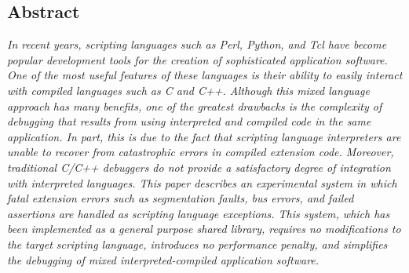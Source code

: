\author{{David M.\ Beazley} \\
{\em Department of Computer Science} \\
{\em University of Chicago }\\
{\em Chicago, Illinois 60637 }\\
{\em beazley@cs.uchicago.edu }}

 

\maketitle

\thispagestyle{empty}


\subsection*{Abstract}
{\em
In recent years, scripting languages such as Perl, Python, and Tcl
have become popular development tools for the creation of
sophisticated application software.  One of the most useful features
of these languages is their ability to easily interact with compiled
languages such as C and C++.  Although this mixed language approach
has many benefits, one of the greatest drawbacks is the complexity of
debugging that results from using interpreted and compiled code in the
same application.  In part, this is due to the fact that scripting
language interpreters are unable to recover from catastrophic errors
in compiled extension code. Moreover, traditional C/C++ debuggers
do not provide a satisfactory degree of integration with interpreted
languages.  This paper describes an experimental system in which fatal
extension errors such as segmentation faults, bus errors, and failed
assertions are handled as scripting language exceptions.  This system,
which has been implemented as a general purpose shared library,
requires no modifications to the target scripting language, introduces
no performance penalty, and simplifies the debugging of mixed
interpreted-compiled application software.
}

